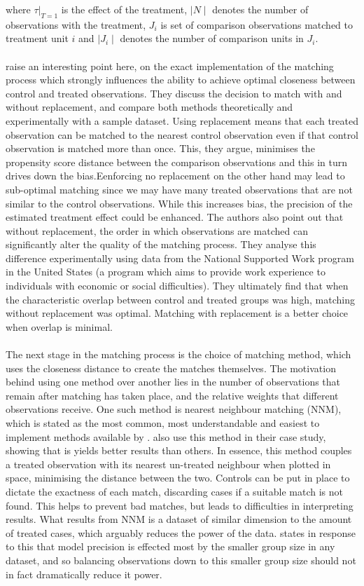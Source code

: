 {{where $\tau | _{T=1}$ is the effect of the treatment, $\mid N \mid$ denotes the number of observations with the treatment, $J_i$ is set of comparison observations matched to treatment unit $i$ and $\mid J_i \mid$ denotes the number of comparison units in $ J_i $.  
\\\\
\cite{dehejiaPSM} raise an interesting point here, on the exact implementation of the matching process which strongly influences the ability to achieve optimal closeness between control and treated observations. They discuss the decision to match with and without replacement, and compare both methods theoretically and experimentally with a sample dataset. Using replacement means that each treated observation can be matched to the nearest control observation even if that control observation is matched more than once. This, they argue, minimises the propensity score distance between the comparison observations and this in turn drives down the bias.Eenforcing no replacement on the other hand may lead to sub-optimal matching since we may have many treated observations that are not similar to the control observations. While this increases bias, the precision of the estimated treatment effect could be enhanced. The authors also point out that without replacement, the order in which observations are matched can significantly alter the quality of the matching process. They analyse this difference experimentally using data from the National Supported Work program in the United States (a program which aims to provide work experience to individuals with economic or social difficulties). They ultimately find that when the characteristic overlap between control and treated groups was high, matching without replacement was optimal. Matching with replacement is a better choice when overlap is minimal. 
\\\\
The next stage in the matching process is the choice of matching method, which uses the closeness distance to create the matches themselves. The motivation behind using one method over another lies in the number of observations that remain after matching has taken place, and the relative weights that different observations receive. One such method is nearest neighbour matching (NNM), which is stated as the most common, most understandable and easiest to implement methods available by \cite{stuart2010matching}. \cite{dehejiaPSM} also use this method in their case study, showing that is yields better results than others. In essence, this method couples a treated observation with its nearest un-treated neighbour when plotted in space, minimising the distance between the two. Controls can be put in place to dictate the exactness of each match, discarding cases if a suitable match is not found. This helps to prevent bad matches, but leads to difficulties in interpreting results. What results from NNM is a dataset of similar dimension to the amount of treated cases, which arguably reduces the power of the data. \cite{stuart2010matching} states in response to this that model precision is effected most by the smaller group size in any dataset, and so balancing observations down to this smaller group size should not in fact dramatically reduce it power. 
}}
